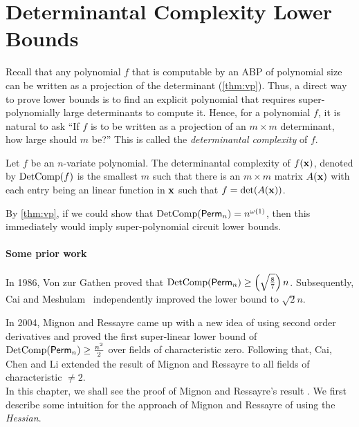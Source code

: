 \chapter{Determinantal Complexity Lower Bounds}\label{chap:dc}

Recall that any polynomial $f$ that is computable by an ABP of polynomial size can be written as a projection of the determinant (\autoref{thm:vp}). 
Thus, a direct way to prove lower bounds is to find an explicit polynomial that requires super-polynomially large determinants to compute it. 
Hence, for a polynomial $f$, it is natural to ask ``If $f$ is to be written as a projection of an $m\times m$ determinant, how large should $m$ be?''
This is called the \emph{determinantal complexity} of $f$. 

\begin{definition}
  Let $f$ be an $n$-variate polynomial.
  The determinantal complexity of $f(\mathbf{x})$, denoted by $\operatorname{DetComp}(f)$ is the smallest $m$ such that there is an $m\times m$ matrix $A(\mathbf{x})$ with each entry being an linear function in $\mathbf{x}$ such that $f = \det(A(\mathbf{x}))$. 
\end{definition}

\noindent
By \autoref{thm:vp}, if we could show that $\operatorname{DetComp}(\operatorname{\mathsf{Perm}}_n) = n^{\omega(1)}$, then this immediately would imply super-polynomial circuit lower bounds. 

\subsubsection*{Some prior work}

In 1986, Von zur Gathen \cite{von1986} proved that $\operatorname{DetComp}(\operatorname{\mathsf{Perm}}_n) \geq \left(\sqrt{\frac{8}{7}}\right)n$.
Subsequently, Cai \cite{cai1990} and Meshulam~\cite{mesh1989} independently improved the lower bound to $\sqrt{2}n$.

In 2004, Mignon and Ressayre\cite{mr04} came up with a new idea of using second order derivatives and proved the first super-linear lower bound of $\operatorname{DetComp}(\operatorname{\mathsf{Perm}}_n) \geq \frac{n^2}{2}$ over fields of characteristic zero.
Following that, Cai, Chen and Li \cite{ccl2008} extended the result of Mignon and Ressayre to all fields of characteristic $\neq 2$.\\

In this chapter, we shall see the proof of Mignon and Ressayre's result%
.
We first describe some intuition for the approach of Mignon and Ressayre of using the \emph{Hessian}. 

